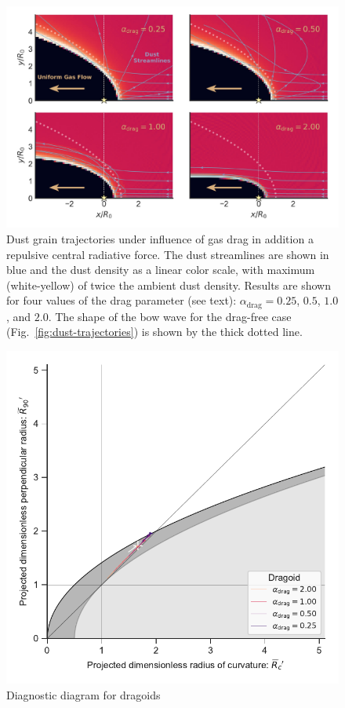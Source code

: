\begin{figure}
  \centering
  \includegraphics[width=\linewidth]{figs/dust-couple-stream-annotate}
  \caption{Dust grain trajectories under influence of gas drag in
    addition a repulsive central radiative force.  The dust
    streamlines are shown in blue and the dust density as a linear
    color scale, with maximum (white-yellow) of twice the ambient dust
    density.  Results are shown for four values of the drag parameter
    (see text): \(\alpha_\text{drag} = 0.25\), \(0.5\), \(1.0\), and
    \(2.0\). The shape of the bow wave for the drag-free case
    (Fig.~\ref{fig:dust-trajectories}) is shown by the thick dotted
    line.}
  \label{fig:dust-wave-coupling}
\end{figure}

\begin{figure}
  \centering
  \includegraphics[width=\linewidth]{figs/dragoid-R90-vs-Rc}
  \caption{Diagnostic diagram for dragoids}
  \label{fig:dragoid-Rc-R90}
\end{figure}

